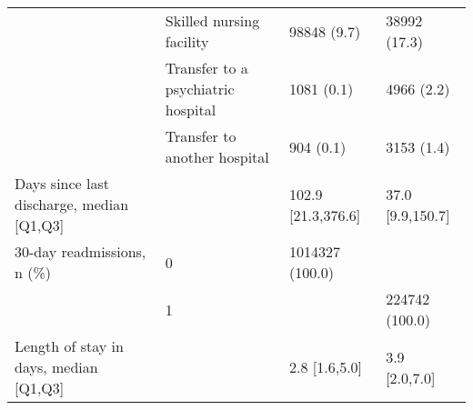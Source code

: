 \begin{tabular}{llll}
                                       & Skilled nursing facility &                    98848 (9.7) &      38992 (17.3) \\
                                       & Transfer to a psychiatric hospital &                     1081 (0.1) &        4966 (2.2) \\
                                       & Transfer to another hospital &                      904 (0.1) &        3153 (1.4) \\
Days since last discharge, median [Q1,Q3] &   &             102.9 [21.3,376.6] &  37.0 [9.9,150.7] \\
30-day readmissions, n (\%) & 0 &                1014327 (100.0) &                   \\
                                       & 1 &                                &    224742 (100.0) \\
Length of stay in days, median [Q1,Q3] &   &                  2.8 [1.6,5.0] &     3.9 [2.0,7.0] \\
\bottomrule
\end{tabular}
